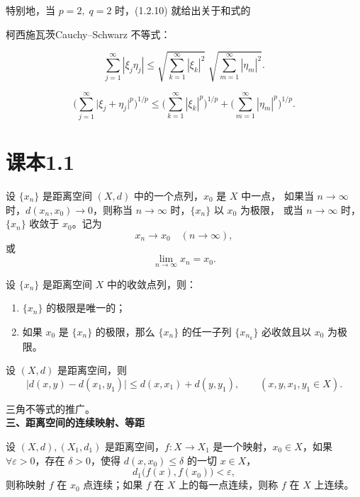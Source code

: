 特别地，当 $p=2,\; q=2$ 时，(1.2.10) 就给出关于和式的
\begin{theorem}{柯西施瓦茨Cauchy–Schwarz 不等式}：

\begin{equation}
\sum_{j=1}^{\infty} |\xi_j \eta_j|
\le
\sqrt{ \sum_{k=1}^{\infty} |\xi_k|^2 } \;
\sqrt{ \sum_{m=1}^{\infty} |\eta_m|^2 }.
\tag{1.2.11}
\end{equation}
\end{theorem}
\begin{theorem}[闵可夫斯基不等式]
    \begin{equation}
\Biggl(\sum_{j=1}^{\infty} \bigl|\xi_j + \eta_j \bigr|^p \Biggr)^{1/p}
\le
\Biggl(\sum_{k=1}^{\infty} |\xi_k|^p \Biggr)^{1/p}
+
\Biggl(\sum_{m=1}^{\infty} |\eta_m|^p \Biggr)^{1/p}.
\tag{1.2.12}
\end{equation}
\end{theorem}


\section{课本1.1}
\begin{definition}[收敛与极限]
设 $\{x_n\}$ 是距离空间 $(X,d)$ 中的一个点列，$x_0$ 是 $X$ 中一点，  
如果当 $n \to \infty$ 时，$d(x_n, x_0) \to 0$，则称当 $n \to \infty$ 时，$\{x_n\}$ 以 $x_0$ 为极限，  
或当 $n \to \infty$ 时，$\{x_n\}$ 收敛于 $x_0$。记为
\[
x_n \to x_0 \quad (n \to \infty),
\]
或
\[
\lim_{n \to \infty} x_n = x_0.
\]
\end{definition}
\begin{theorem}
设 $\{x_n\}$ 是距离空间 $X$ 中的收敛点列，则：
\begin{enumerate}
  \item $\{x_n\}$ 的极限是唯一的；
  \item 如果 $x_0$ 是 $\{x_n\}$ 的极限，那么 $\{x_n\}$ 的任一子列 $\{x_{n_k}\}$ 必收敛且以 $x_0$ 为极限。
\end{enumerate}
\end{theorem}
\begin{theorem}
设 $(X,d)$ 是距离空间，则
\[
\big| d(x,y) - d(x_1,y_1) \big|
\leq d(x,x_1) + d(y,y_1), 
\qquad (x,y,x_1,y_1 \in X).
\]
\end{theorem}
三角不等式的推广。\\
\noindent\textbf{三、距离空间的连续映射、等距}

设 $(X,d), (X_1,d_1)$ 是距离空间，$f: X \to X_1$ 是一个映射，$x_0 \in X$，如果  
$\forall \varepsilon > 0$，存在 $\delta > 0$，使得 $d(x,x_0) \leq \delta$ 的一切 $x \in X$，  
\[
d_1\big(f(x), f(x_0)\big) < \varepsilon,
\]
则称映射 $f$ 在 $x_0$ 点连续；如果 $f$ 在 $X$ 上的每一点连续，则称 $f$ 在 $X$ 上连续。  

